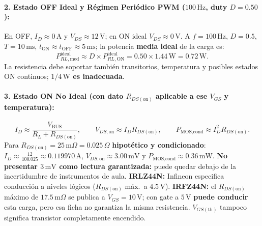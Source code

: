 \documentclass[10pt, a4paper, landscape]{article}
\begin{document}
\paragraph{2. Estado OFF Ideal y Régimen Periódico PWM ($100\,\text{Hz}$, duty $D = 0.50$):}
En OFF, $I_D \approx 0\,\text{A}$ y $V_{DS} \approx 12\,\text{V}$; en ON ideal $V_{DS} \approx 0\,\text{V}$. A $f = 100\,\text{Hz}$, $D = 0.5$, $T = 10\,\text{ms}$, $t_{\text{ON}} \approx t_{\text{OFF}} \approx 5\,\text{ms}$; la potencia \textbf{media ideal} de la carga es:
\begin{equation}
    P_{RL,\text{med}}^{\text{ideal}} \approx D \times P_{RL,\text{ON}}^{\text{ideal}} = 0.50 \times 1.44\,\text{W} = 0.72\,\text{W}.
\end{equation}
La resistencia debe soportar también transitorios, temperatura y posibles estados ON continuos; \textbf{$1/4\,\text{W}$ es inadecuada}.

\paragraph{3. Estado ON No Ideal (con dato $R_{DS(\text{on})}$ aplicable a ese $V_{GS}$ y temperatura):}
\begin{equation}
    I_D \approx \frac{V_{\text{BUS}}}{R_L + R_{DS(\text{on})}}, \qquad V_{DS,\text{on}} \approx I_D R_{DS(\text{on})}, \qquad P_{\text{MOS,cond}} \approx I_D^2 R_{DS(\text{on})}.
\end{equation}
Para $R_{DS(\text{on})} = 25\,\text{m}\Omega = 0.025\,\Omega$ \textbf{hipotético y condicionado}: $I_D \approx \frac{12}{100.025} \approx 0.119970\,\text{A}$, $V_{DS,\text{on}} \approx 3.00\,\text{mV}$ y $P_{\text{MOS,cond}} \approx 0.36\,\text{mW}$. \textbf{No presentar $3\,\text{mV}$ como lectura garantizada:} puede quedar debajo de la incertidumbre de instrumentos de aula. \textbf{IRLZ44N:} Infineon especifica conducción a niveles lógicos ($R_{DS(\text{on})}$ máx.\ a $4.5\,\text{V}$). \textbf{IRFZ44N:} el $R_{DS(\text{on})}$ máximo de $17.5\,\text{m}\Omega$ se publica a $V_{GS}=10\,\text{V}$; con gate a $5\,\text{V}$ \textbf{puede conducir} esta carga, pero esa ficha no garantiza la misma resistencia. $V_{GS(\text{th})}$ tampoco significa transistor completamente encendido.
\end{document}
